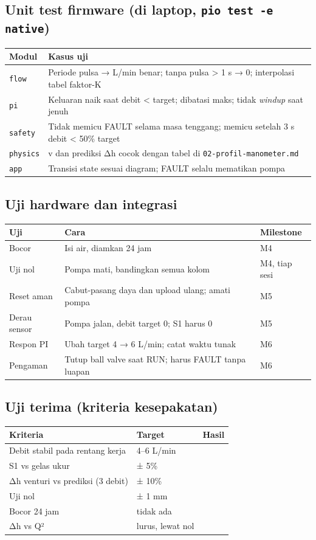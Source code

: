 \documentclass[11pt,a4paper]{article}
\begin{document}
\subsection{Unit test firmware (di laptop, \texttt{pio test -e native})}
\begin{tabularx}{\linewidth}{@{}l L@{}}
\toprule
\textbf{Modul} & \textbf{Kasus uji} \\
\midrule
\texttt{flow} & Periode pulsa → L/min benar; tanpa pulsa > 1 s → 0; interpolasi tabel faktor-K \\
\texttt{pi} & Keluaran naik saat debit < target; dibatasi maks; tidak \emph{windup} saat jenuh \\
\texttt{safety} & Tidak memicu FAULT selama masa tenggang; memicu setelah 3 s debit < 50\% target \\
\texttt{physics} & v dan prediksi Δh cocok dengan tabel di \texttt{02-profil-manometer.md} \\
\texttt{app} & Transisi state sesuai diagram; FAULT selalu mematikan pompa \\
\bottomrule
\end{tabularx}

\subsection{Uji hardware dan integrasi}
\begin{tabularx}{\linewidth}{@{}l L l@{}}
\toprule
\textbf{Uji} & \textbf{Cara} & \textbf{Milestone} \\
\midrule
Bocor & Isi air, diamkan 24 jam & M4 \\
Uji nol & Pompa mati, bandingkan semua kolom & M4, tiap sesi \\
Reset aman & Cabut-pasang daya dan upload ulang; amati pompa & M5 \\
Derau sensor & Pompa jalan, debit target 0; S1 harus 0 & M5 \\
Respon PI & Ubah target 4 → 6 L/min; catat waktu tunak & M6 \\
Pengaman & Tutup ball valve saat RUN; harus FAULT tanpa luapan & M6 \\
\bottomrule
\end{tabularx}

\subsection{Uji terima (kriteria kesepakatan)}
\begin{tabularx}{\linewidth}{@{}L l l@{}}
\toprule
\textbf{Kriteria} & \textbf{Target} & \textbf{Hasil} \\
\midrule
Debit stabil pada rentang kerja & 4--6 L/min & \\
S1 vs gelas ukur & ± 5\% & \\
Δh venturi vs prediksi (3 debit) & ± 10\% & \\
Uji nol & ± 1 mm & \\
Bocor 24 jam & tidak ada & \\
Δh vs Q² & lurus, lewat nol & \\
\bottomrule
\end{tabularx}
\end{document}
